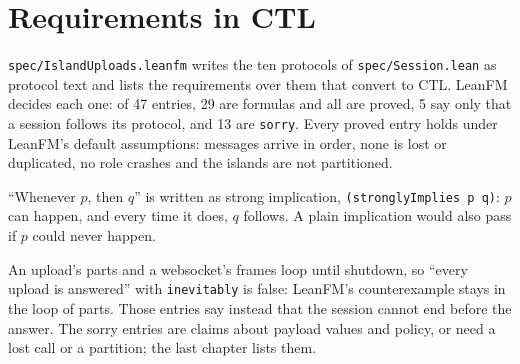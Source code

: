 \documentclass[11pt,oneside]{book}
\begin{document}
\chapter{Requirements in CTL}
\texttt{spec/IslandUploads.leanfm} writes the ten protocols of
\texttt{spec/Session.lean} as protocol text and lists the requirements over
them that convert to CTL. LeanFM decides each one: of 47 entries, 29 are
formulas and all are proved, 5 say only that a session follows its protocol,
and 13 are \texttt{sorry}. Every proved entry holds under LeanFM's default
assumptions: messages arrive in order, none is lost or duplicated, no role
crashes and the islands are not partitioned.

``Whenever $p$, then $q$'' is written as strong implication,
\texttt{(stronglyImplies p q)}: $p$ can happen, and every time it does, $q$
follows. A plain implication would also pass if $p$ could never happen.

An upload's parts and a websocket's frames loop until shutdown, so
``every upload is answered'' with \texttt{inevitably} is false: LeanFM's
counterexample stays in the loop of parts. Those entries say instead that
the session cannot end before the answer. The sorry entries are claims about
payload values and policy, or need a lost call or a partition; the last
chapter lists them.


\end{document}
